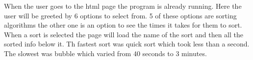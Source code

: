 When the user goes to the html page the program is already running. Here the user will be greeted by 6 options to select from. 5 of these options are sorting algorithms the other one is an option to see the times it takes for them to sort. When a sort is selected the page will load the name of the sort and then all the sorted info below it. Th fastest sort was quick sort which took less than a second. The slowest was bubble which varied from 40 seconds to 3 minutes. 